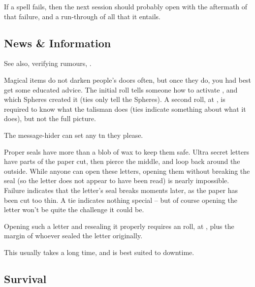 \begin{multicols}{2}
{  If a spell fails, then the next session should probably open with the aftermath of that failure, and a run-through of all that it entails.
}{}


\subsection{News \& Information}

See also, verifying rumours, .

Magical items do not darken people's doors often, but once they do, you had best get some educated advice.
The initial roll tells someone how to activate , and which Spheres created it (ties only tell the Spheres).
A second roll, at \tn[14], is required to know what the \gls{talisman} does (ties indicate something about what it does), but not the full picture.


The message-hider can set any \gls{tn} they please.

Proper seals have more than a blob of wax to keep them safe.
Ultra secret letters have parts of the paper cut, then pierce the middle, and loop back around the outside.
While anyone can open these letters, opening them without breaking the seal (so the letter does not appear to have been read) is nearly impossible.
Failure indicates that the letter's seal breaks moments later, as the paper has been cut too thin.
A tie indicates nothing special -- but of course opening the letter won't be quite the challenge it could be.

Opening such a letter and resealing it properly requires an  roll, at \tn[14], plus the margin of whoever sealed the letter originally.

This usually takes a long time, and is best suited to \gls{downtime}.

\subsection{Survival}


\end{multicols}

